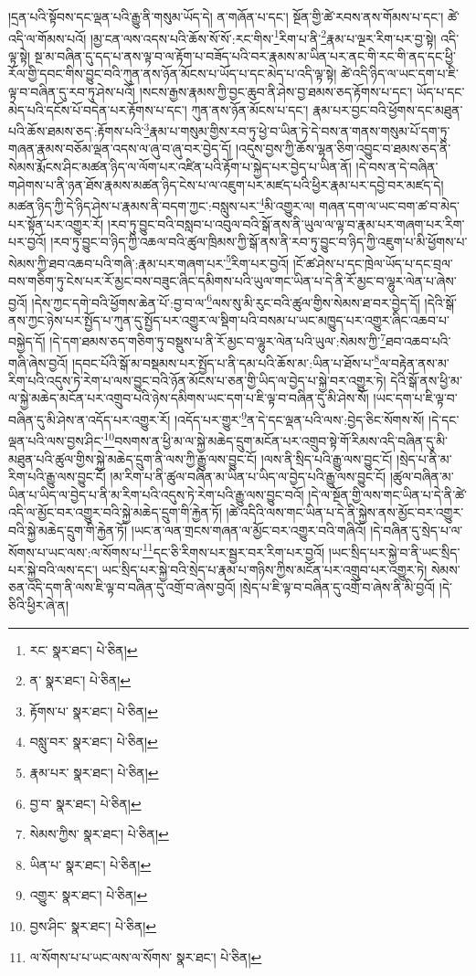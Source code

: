 །དྲན་པའི་སྟོབས་དང་ལྡན་པའི་རྒྱུ་ནི་གསུམ་ཡོད་དེ། ན་གཞོན་པ་དང་། སྔོན་གྱི་ཚེ་རབས་ནས་གོམས་པ་དང་། ཚེ་འདི་ལ་གོམས་པའོ། །མྱ་ངན་ལས་འདས་པའི་ཆོས་སོ་སོ་:རང་གིས་\footnote{རང་  སྣར་ཐང་།  པེ་ཅིན། }རིག་པ་ནི་\footnote{ན་  སྣར་ཐང་།  པེ་ཅིན། }རྣམ་པ་ལྔར་རིག་པར་བྱ་སྟེ། འདི་ལྟ་སྟེ། སྔ་མ་བཞིན་དུ་དད་པ་ནས་ལྟ་བ་ལ་རྟོག་པ་བཟོད་པའི་བར་རྣམས་མ་ཡིན་པར་ནང་གི་རང་གི་ནད་དང་ཕྱི་རོལ་གྱི་དབང་གིས་བྱུང་བའི་ཀུན་ནས་ཉོན་མོངས་པ་ཡོད་པ་དང་མེད་པ་འདི་ལྟ་སྟེ། ཚེ་འདི་ཉིད་ལ་ཡང་དག་པ་ཇི་ལྟ་བ་བཞིན་དུ་རབ་ཏུ་ཤེས་པའོ། །སངས་རྒྱས་རྣམས་ཀྱི་བྱང་ཆུབ་ནི་ཤེས་བྱ་ཐམས་ཅད་རྟོགས་པ་དང་། ཡོད་པ་དང་མེད་པའི་དངོས་པོ་བདེན་པར་རྟོགས་པ་དང་། ཀུན་ནས་ཉོན་མོངས་པ་དང་། རྣམ་པར་བྱང་བའི་ཕྱོགས་དང་མཐུན་པའི་ཆོས་ཐམས་ཅད་:རྟོགས་པའི་\footnote{རྟོགས་པ་  སྣར་ཐང་།  པེ་ཅིན། }རྣམ་པ་གསུམ་གྱིས་རབ་ཏུ་ཕྱེ་བ་ཡིན་ཏེ་དེ་བས་ན་གནས་གསུམ་པོ་དག་ཏུ་གཞན་རྣམས་བཅོམ་ལྡན་འདས་ལ་ཞུ་བ་ཞུ་བར་བྱེད་དོ། །འདུས་བྱས་ཀྱི་ཆོས་ལྷན་ཅིག་འབྱུང་བ་ཐམས་ཅད་ནི་སེམས་རྨོངས་ཤིང་མཚན་ཉིད་ལ་ལོག་པར་འཛིན་པའི་རྟོག་པ་སྐྱེད་པར་བྱེད་པ་ཡིན་ནོ། །དེ་བས་ན་དེ་བཞིན་གཤེགས་པ་ནི་ཉན་ཐོས་རྣམས་མཚན་ཉིད་ངེས་པ་ལ་འཇུག་པར་མཛད་པའི་ཕྱིར་རྣམ་པར་དབྱེ་བར་མཛད་དེ། མཚན་ཉིད་ཀྱི་དེ་ཉིད་ཤེས་པ་རྣམས་ནི་བདག་ཀྱང་:བསླུས་པར་\footnote{བསླུ་བར་  སྣར་ཐང་།  པེ་ཅིན། }མི་འགྱུར་ལ། གཞན་དག་ལ་ཡང་བག་ཚ་བ་མེད་པར་སྟོན་པར་འགྱུར་རོ། །རབ་ཏུ་བྱུང་བའི་བསླབ་པ་འབུལ་བའི་སྒོ་ནས་ནི་ཡུལ་ལ་ལྟ་བ་རྣམ་པར་གཞག་པར་རིག་པར་བྱའོ། །རབ་ཏུ་བྱུང་བ་ཉིད་ཀྱི་འཆལ་བའི་ཚུལ་ཁྲིམས་ཀྱི་སྒོ་ནས་ནི་རབ་ཏུ་བྱུང་བ་ཉིད་ཀྱི་འཇུག་པ་མི་ཕྱོགས་པ་སེམས་ཀྱི་ཐབ་འཆབ་པའི་གཞི་:རྣམ་པར་གཞག་པར་\footnote{རྣམ་པར་  སྣར་ཐང་།  པེ་ཅིན། }རིག་པར་བྱའོ། །ངོ་ཚ་ཤེས་པ་དང་ཁྲེལ་ཡོད་པ་དང་བྲལ་བས་གཅིག་ཏུ་ངེས་པར་རོ་མྱང་བས་བཟུང་ཞིང་དམིགས་པའི་ཡུལ་གང་ཡིན་པ་དེ་ནི་རོ་མྱང་བ་ལྷུར་ལེན་པ་ཞེས་བྱའོ། །དེས་ཀྱང་དགེ་བའི་ཕྱོགས་ཆེན་པོ་:བྱ་བ་ལ་\footnote{བྱ་བ་  སྣར་ཐང་།  པེ་ཅིན། }ལས་སུ་མི་རུང་བའི་ཚུལ་གྱིས་སེམས་ཐ་བར་བྱེད་དོ། །དེའི་སྒོ་ནས་ཀྱང་ཉེས་པར་སྤྱོད་པ་ཀུན་དུ་སྤྱོད་པར་འགྱུར་ལ་སྡིག་པའི་བསམ་པ་ཡང་མཁྱུད་པར་འགྱུར་ཞིང་འཆབ་པ་བསྐྱེད་དོ། །དེ་དག་ཐམས་ཅད་གཅིག་ཏུ་བསྡུས་པ་ནི་རོ་མྱང་བ་ལྷུར་ལེན་པའི་ཡུལ་:སེམས་ཀྱི་\footnote{སེམས་ཀྱིས་  སྣར་ཐང་།  པེ་ཅིན། }ཐབ་འཆབ་པའི་གཞི་ཞེས་བྱའོ། །དབང་པོའི་སྒོ་མ་བསྡམས་པར་སྤྱོད་པ་ནི་དམ་པའི་ཆོས་མ་:ཡིན་པ་ཐོས་པ་\footnote{ཡིན་པ་  སྣར་ཐང་།  པེ་ཅིན། }ལ་བརྟེན་ནས་མ་རིག་པའི་འདུས་ཏེ་རེག་པ་ལས་བྱུང་བའི་ཉོན་མོངས་པ་ཅན་གྱི་ཡིད་ལ་བྱེད་པ་སྐྱེ་བར་འགྱུར་ཏེ། དེའི་སྒོ་ནས་ཕྱི་མ་ལ་སྐྱེ་མཆེད་མངོན་པར་འགྲུབ་པའི་ཉེས་དམིགས་ཡང་དག་པ་ཇི་ལྟ་བ་བཞིན་དུ་མི་ཤེས་སོ། །ཡང་དག་པ་ཇི་ལྟ་བ་བཞིན་དུ་མི་ཤེས་ན་འདོད་པར་འགྱུར་རོ། །འདོད་པར་གྱུར་\footnote{འགྱུར་  སྣར་ཐང་།  པེ་ཅིན། }ན་དེ་དང་ལྡན་པའི་ལས་:བྱེད་ཅིང་སོགས་སོ། །དེ་དང་ལྡན་པའི་ལས་བྱས་ཤིང་\footnote{བྱས་ཤིང་  སྣར་ཐང་།  པེ་ཅིན། }བསགས་ན་ཕྱི་མ་ལ་སྐྱེ་མཆེད་དྲུག་མངོན་པར་འགྲུབ་སྟེ་གོ་རིམས་འདི་བཞིན་དུ་མི་མཐུན་པའི་ཚུལ་གྱིས་སྐྱེ་མཆེད་དྲུག་ནི་ལས་ཀྱི་རྒྱུ་ལས་བྱུང་ངོ། །ལས་ནི་སྲིད་པའི་རྒྱུ་ལས་བྱུང་ངོ། །སྲེད་པ་ནི་མ་རིག་པའི་རྒྱུ་ལས་བྱུང་ངོ། །མ་རིག་པ་ནི་ཚུལ་བཞིན་མ་ཡིན་པ་ཡིད་ལ་བྱེད་པའི་རྒྱུ་ལས་བྱུང་ངོ། །ཚུལ་བཞིན་མ་ཡིན་པ་ཡིད་ལ་བྱེད་པ་ནི་མ་རིག་པའི་འདུས་ཏེ་རེག་པའི་རྒྱུ་ལས་བྱུང་བའོ། །དེ་ལ་སྔོན་གྱི་ལས་གང་ཡིན་པ་དེ་ནི་ཚེ་འདི་ལ་མྱོང་བར་འགྱུར་བའི་སྐྱེ་མཆེད་དྲུག་གི་རྐྱེན་ཏོ། །ཚེ་འདིའི་ལས་གང་ཡིན་པ་དེ་ནི་སྐྱེས་ནས་མྱོང་བར་འགྱུར་བའི་སྐྱེ་མཆེད་དྲུག་གི་རྐྱེན་ཏོ། །ཡང་ན་ལན་གྲངས་གཞན་ལ་མྱོང་བར་འགྱུར་བའི་གཞིའོ། །དེ་བཞིན་དུ་སྲེད་པ་ལ་སོགས་པ་ཡང་ལས་:ལ་སོགས་པ་\footnote{ལ་སོགས་པ་པ་ཡང་ལས་ལ་སོགས་  སྣར་ཐང་།  པེ་ཅིན། }དང་ཅི་རིགས་པར་སྦྱར་བར་རིག་པར་བྱའོ། །ཡང་སྲིད་པར་སྐྱེ་བ་ནི་ཡང་སྲིད་པར་སྐྱེ་བའི་ལས་དང་། ཡང་སྲིད་པར་སྐྱེ་བའི་སྲེད་པ་རྣམ་པ་གཉིས་ཀྱིས་མངོན་པར་འགྲུབ་པར་འགྱུར་ཏེ། སེམས་ཅན་འདི་དག་ནི་ལས་ཇི་ལྟ་བ་བཞིན་དུ་འགྲོ་བ་ཞེས་བྱའོ། །སྲེད་པ་ཇི་ལྟ་བ་བཞིན་དུ་འགྲོ་བ་ཞེས་ནི་མི་བྱའོ། །དེ་ཅིའི་ཕྱིར་ཞེ་ན། 